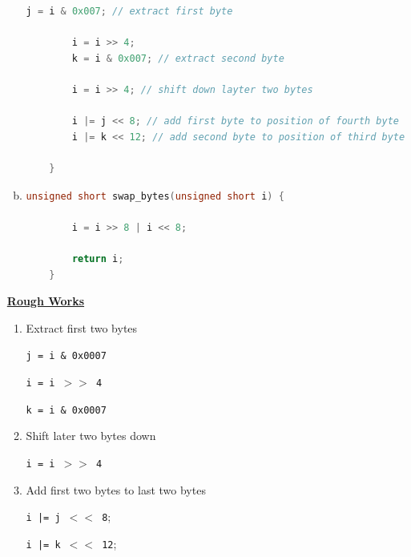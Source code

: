\documentclass[12pt]{article}
\begin{document}
\begin{enumerate}[1.]
\begin{enumerate}[a)]
\begin{lstlisting}[language=c]
        j = i & 0x007; // extract first byte

        i = i >> 4;
        k = i & 0x007; // extract second byte

        i = i >> 4; // shift down layter two bytes

        i |= j << 8; // add first byte to position of fourth byte
        i |= k << 12; // add second byte to position of third byte

    }
\end{lstlisting}

        \item

\begin{lstlisting}[language=c]
    unsigned short swap_bytes(unsigned short i) {

        i = i >> 8 | i << 8;

        return i;
    }
\end{lstlisting}

    \end{enumerate}

    \bigskip

    \underline{\textbf{Rough Works}}

    \bigskip

    \begin{enumerate}[1.]
        \item Extract first two bytes

        \bigskip

        \texttt{j = i \& 0x0007}

        \texttt{i = i $>>$ 4}

        \texttt{k = i \& 0x0007}

        \bigskip

        \item Shift later two bytes down

        \bigskip

        \texttt{i = i $>>$ 4}

        \bigskip

        \item Add first two bytes to last two bytes

        \bigskip

        \texttt{i |= j $<<$ 8};

        \texttt{i |= k $<<$ 12};

        \bigskip

    \end{enumerate}


\end{enumerate}
\end{document}
